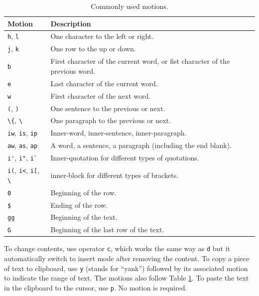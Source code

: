\begin{table}
  \centering \caption{Commonly used motions.}\label{ch:tfe:tab:motion}
  \begin{tabularx}{\textwidth}{lX}
    \hline
    Motion & Description \\ \hline
    \verb|h|, \verb|l| & One character to the left or right. \\ \hdashline
    \verb|j|, \verb|k| & One row to the up or down. \\ \hdashline
    \verb|b| & First character of the current word, or fist character of the previous word. \\ \hdashline
    \verb|e| & Last character of the current word. \\ \hdashline
    \verb|w| & First character of the next word. \\ \hdashline
    \verb|(|, \verb|)| & One sentence to the previous or next. \\ \hdashline
    \lstinline{\{}, \lstinline{\}} & One paragraph to the previous or next. \\ \hdashline
    \verb|iw|, \verb|is|, \verb|ip| & Inner-word, inner-sentence, inner-paragraph. \\ \hdashline
    \verb|aw|, \verb|as|, \verb|ap| & A word, a sentence, a paragraph (including the end blank). \\ \hdashline
    \verb|i'|, \verb|i"|, \verb|i`| & Inner-quotation for different types of quotations. \\ \hdashline
    \verb|i(|, \verb|i<|, \verb|i[|, \lstinline{\}} & inner-block for different types of brackets. \\ \hdashline
    \verb|0| & Beginning of the row. \\ \hdashline
    \verb|$| & Ending of the row. \\ \hdashline
    \verb|gg| & Beginning of the text. \\ \hdashline
    \verb|G| & Beginning of the last row of the text. \\
    \hline
  \end{tabularx}
\end{table}

To change contents, use operator \verb|c|, which works the same way as \verb|d| but it automatically switch to insert mode after removing the content. To copy a piece of text to clipboard, use \verb|y| (stands for ``yank'') followed by its associated motion to indicate the range of text. The motions also follow Table \ref{ch:tfe:tab:motion}. To paste the text in the clipboard to the cursor, use \verb|p|. No motion is required.

